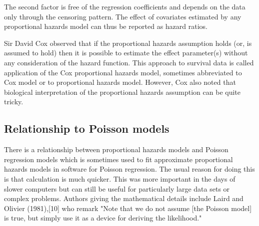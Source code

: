 The second factor is free of the regression coefficients and depends on the data only through the censoring pattern. The effect of covariates estimated by any proportional hazards model can thus be reported as hazard ratios.


Sir David Cox observed that if the proportional hazards assumption holds (or, is assumed to hold) then it is possible to estimate the effect parameter(s) without any consideration of the hazard function. This approach to survival data is called application of the Cox proportional hazards model, sometimes abbreviated to Cox model or to proportional hazards model. However, Cox also noted that biological interpretation of the proportional hazards assumption can be quite tricky.


\subsection{Relationship to Poisson models}

There is a relationship between proportional hazards models and Poisson regression models which is sometimes used to fit approximate proportional hazards models in software for Poisson regression. The usual reason for doing this is that calculation is much quicker. This was more important in the days of slower computers but can still be useful for particularly large data sets or complex problems. Authors giving the mathematical details include Laird and Olivier (1981),[10] who remark
"Note that we do not assume [the Poisson model] is true, but simply use it as a device for deriving the likelihood."
